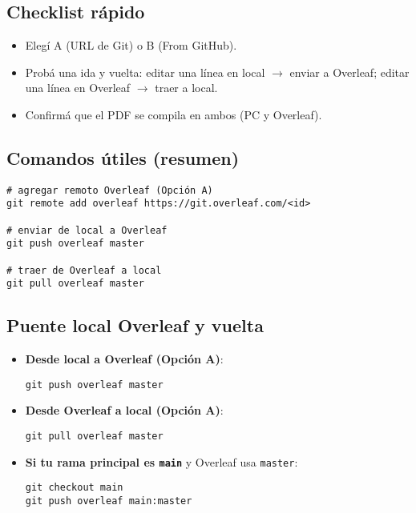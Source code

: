\subsection*{Checklist rápido}
\begin{itemize}[leftmargin=1.2em]
  \item Elegí A (URL de Git) o B (From GitHub).
  \item Probá una ida y vuelta: editar una línea en local $\rightarrow$ enviar a Overleaf; editar una línea en Overleaf $\rightarrow$ traer a local.
  \item Confirmá que el PDF se compila en ambos (PC y Overleaf).
\end{itemize}

\subsection*{Comandos útiles (resumen)}
\begin{verbatim}
# agregar remoto Overleaf (Opción A)
git remote add overleaf https://git.overleaf.com/<id>

# enviar de local a Overleaf
git push overleaf master

# traer de Overleaf a local
git pull overleaf master
\end{verbatim}

\subsection*{Puente local \textrightarrow{} Overleaf y vuelta}
\begin{itemize}[leftmargin=1.2em]
  \item \textbf{Desde local a Overleaf (Opción A)}:
\begin{verbatim}
git push overleaf master
\end{verbatim}
  \item \textbf{Desde Overleaf a local (Opción A)}:
\begin{verbatim}
git pull overleaf master
\end{verbatim}
  \item \textbf{Si tu rama principal es \texttt{main}} y Overleaf usa \texttt{master}:
\begin{verbatim}
git checkout main
git push overleaf main:master
\end{verbatim}
\end{itemize}
